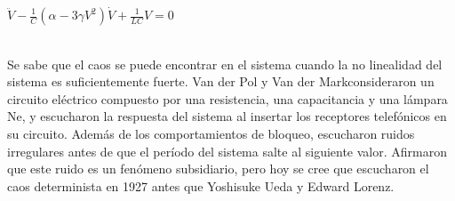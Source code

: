\documentclass[12pt]{article}
\begin{document}
\centerline{$\displaystyle \ddot V - \frac{1}{C}(\alpha-3\gamma V^2)\dot V+\frac{1}{LC}V=0$}
$ $\\
Se sabe que el caos se puede encontrar en el sistema cuando la no linealidad del sistema es suficientemente fuerte. Van der Pol y Van der Markconsideraron un circuito eléctrico compuesto por una resistencia, una capacitancia y una lámpara Ne, y escucharon la respuesta del sistema al insertar los receptores telefónicos en su circuito. Además de los comportamientos de bloqueo, escucharon ruidos irregulares antes de que el período del sistema salte al siguiente valor. Afirmaron que este ruido es un fenómeno subsidiario, pero hoy se cree que escucharon el caos determinista en 1927 antes que Yoshisuke Ueda y Edward Lorenz.


\end{document}
